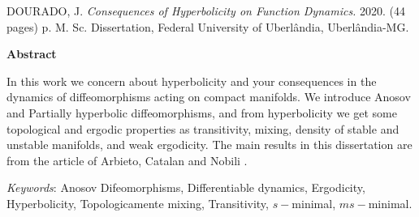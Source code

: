 %

\noindent DOURADO, J. \textit{Consequences of Hyperbolicity on Function Dynamics.} 2020. (44 pages) p. M. Sc. Dissertation, Federal University of Uberlândia, Uberlândia-MG.

\vspace{2cm}

\begin{center}
\textbf{Abstract}
\end{center}

\vspace{2cm}

\noindent In this work we concern about hyperbolicity and your consequences in the dynamics of diffeomorphisms acting on compact manifolds. We introduce Anosov and Partially hyperbolic diffeomorphisms, and from hyperbolicity we get some topological and ergodic properties as transitivity, mixing, density of stable and unstable manifolds, and weak ergodicity. The main results in this dissertation are from the article of Arbieto, Catalan and Nobili \cite{art}.

\bigskip

\noindent\textit{Keywords}: Anosov Difeomorphisms, Differentiable dynamics, Ergodicity, Hyperbolicity, Topologicamente mixing, Transitivity, $s-$minimal, $ms-$minimal.

%